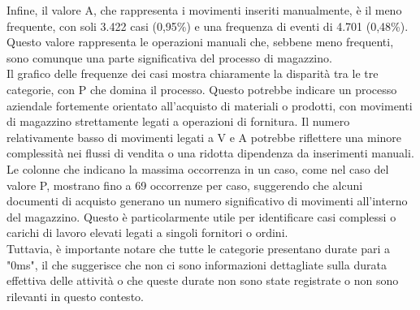 \documentclass{article}
\begin{document}
Infine, il valore A, che rappresenta i movimenti inseriti manualmente, è il meno frequente, con soli 3.422 casi (0,95\%) e una frequenza di eventi di 4.701 (0,48\%). Questo valore rappresenta le operazioni manuali che, sebbene meno frequenti, sono comunque una parte significativa del processo di magazzino.\\
Il grafico delle frequenze dei casi mostra chiaramente la disparità tra le tre categorie, con P che domina il processo. Questo potrebbe indicare un processo aziendale fortemente orientato all'acquisto di materiali o prodotti, con movimenti di magazzino strettamente legati a operazioni di fornitura. Il numero relativamente basso di movimenti legati a V e A potrebbe riflettere una minore complessità nei flussi di vendita o una ridotta dipendenza da inserimenti manuali.\\
Le colonne che indicano la massima occorrenza in un caso, come nel caso del valore P, mostrano fino a 69 occorrenze per caso, suggerendo che alcuni documenti di acquisto generano un numero significativo di movimenti all'interno del magazzino. Questo è particolarmente utile per identificare casi complessi o carichi di lavoro elevati legati a singoli fornitori o ordini.\\
Tuttavia, è importante notare che tutte le categorie presentano durate pari a "0ms", il che suggerisce che non ci sono informazioni dettagliate sulla durata effettiva delle attività o che queste durate non sono state registrate o non sono rilevanti in questo contesto.
\end{document}
